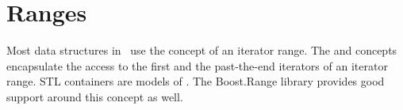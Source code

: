 \section{Ranges} 

Most data structures in \cgal\ use the concept of an iterator range.  The
 and  concepts encapsulate the access to the first
and the past-the-end iterators of an iterator range.  STL containers are models
of .  The Boost.Range library provides good support around this
concept as well.

